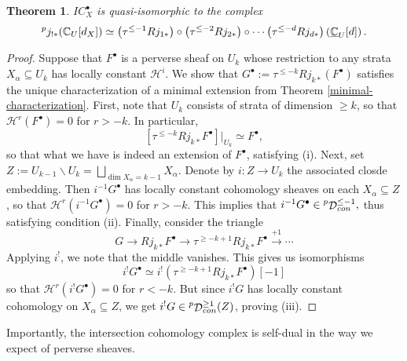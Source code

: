 \documentclass[letterpaper, 12pt]{article}
\newcommand{\C}{\mathbb{C}}
\DeclareMathOperator{\D}{\mathcal{D}}
\newtheorem{theorem}{Theorem}
\theoremstyle{definition}
\theoremstyle{remark}
\newcommand{\sH}{\mathscr{H}}
\begin{document}
\begin{theorem} \label{ic-structure}
    \(IC_X^{\bullet}\) is quasi-isomorphic to the complex
    \begin{equation}
        \prescript{p}{}{j_{!*}}(\C_U[d_X]) \simeq 
        \paren{\tau^{\leq -1}Rj_{1*}} \circ \paren{\tau^{\leq -2}Rj_{2*}} \circ \cdots \paren{\tau^{\leq -d}Rj_{d*}} \paren{\underline{\C}_U[d]}.
    \end{equation}
\end{theorem}
\begin{proof}
Suppose that $F^\bullet$ is a perverse sheaf on $U_k$ whose restriction to 
any strata $X_\alpha \subseteq U_k$ has locally constant $\sH^i$.
We show that $G^\bullet := \tau^{\leq -k} Rj_{k*}(F^\bullet)$ satisfies the
unique characterization of a minimal extension from Theorem 
\ref{minimal-characterization}. First, note that $U_k$ consists of 
strata of dimension $\geq k$, so that \(\sH^r(F^\bullet)  = 0\) for 
\(r > -k\). In particular,
\begin{equation*}
    \left[\tau^{\leq -k} Rj_{k*} F^\bullet\right]|_{U_k} \simeq F^\bullet,
\end{equation*}
so that what we have is indeed an extension of $F^\bullet$, satisfying (i).
Next, set \(Z := U_{k-1} \smallsetminus U_k = 
\bigsqcup_{\dim X_\alpha = k-1} X_\alpha\). Denote by $i: Z \to U_k$ the
associated closde embedding. Then $i^{-1} G^\bullet$ has locally constant 
cohomology sheaves on each $X_\alpha \subseteq Z$, so that 
\(\sH^r(i^{-1} G^\bullet) = 0\) for \(r > -k\). This implies that 
\(i^{-1} G^\bullet \in \prescript{p}{}{\D}_{con}^{\leq -1},\) thus satisfying
condition (ii). Finally, consider the triangle
\begin{equation}
    G \to Rj_{k*} F^\bullet \to \tau^{\geq -k+1} Rj_{k*} F^\bullet
    \overset{+1}{\to} \cdots
\end{equation}
Applying $i^!$, we note that the middle vanishes. This gives us isomorphisms
\begin{equation*}
    i^! G^\bullet \simeq i^! (\tau^{\geq -k+1} Rj_{k*} F^\bullet)[-1]
\end{equation*}
so that $\sH^r(i^! G^\bullet) = 0$ for \(r < -k\). But since \(i^! G\) has locally
constant cohomology on \(X_\alpha \subseteq Z\), we get
\(i^! G \in \prescript{p}{}{\D}_{con}^{\geq 1}(Z)\), proving (iii).
\end{proof}

Importantly, the intersection cohomology complex is self-dual in the way we expect of perverse sheaves.
\end{document}
